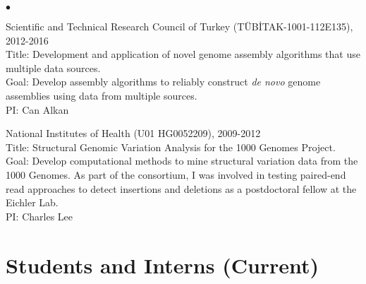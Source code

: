 \documentclass[margin,line]{res}
\newenvironment{list2}{
  \begin{list}{$\bullet$}{%
      \setlength{\itemsep}{0.1cm}
      \setlength{\parsep}{0in} \setlength{\parskip}{0in}
      \setlength{\topsep}{0in} \setlength{\partopsep}{0in} 
      \setlength{\leftmargin}{0.2in}}}{\end{list}}
\begin{document}
\begin{resume}
\begin{list2}
                                       \item
                                         Scientific and Technical Research Council of Turkey (T\"{U}B\.{I}TAK-1001-112E135), 2012-2016\\
                                         Title: Development and application of novel genome assembly algorithms that use multiple data sources.\\
                                         Goal: Develop assembly algorithms to reliably construct \textit{de novo} genome assemblies using data from multiple sources.\\
                                         PI: Can Alkan
                                       \item
                                         National Institutes of Health (U01 HG0052209), 2009-2012\\
                                         Title: Structural Genomic Variation Analysis for the 1000 Genomes Project.\\
                                         Goal: Develop computational methods to mine structural variation data from the 1000 Genomes.
                                         As part of the consortium, I was involved in testing paired-end read approaches to detect insertions and deletions as a postdoctoral fellow at the Eichler Lab.\\
                                         PI: Charles Lee
                                       \end{list2}


\clearpage

\section{\sc Students and Interns (Current)}
\vspace*{-.4cm}

\end{resume}
\end{document}
